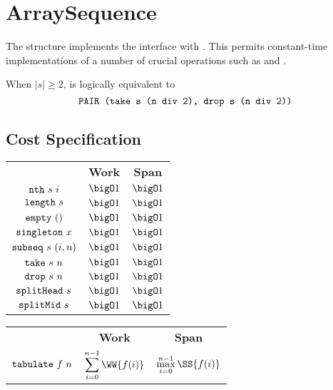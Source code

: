 \chapter{ArraySequence}
\label{ch:array-seq}
\begin{preamble}
The  structure implements the  interface
with . This permits constant-time
implementations of a number of crucial operations such as  and
.
\end{preamble}

\begin{gram}
When $|s| \geq 2$,  is logically equivalent to
\[
  \texttt{PAIR (take s (n div 2), drop s (n div 2))}
\]
\end{gram}

\section{Cost Specification}

\begin{costspec}
\begin{tabular}{c|c|c}
& \textbf{Work} & \textbf{Span} \\
$\texttt{nth}~s~i$ & $\bigO 1$ & $\bigO 1$ \\
$\texttt{length}~s$ & $\bigO 1$ & $\bigO 1$ \\
$\texttt{empty}~()$ & $\bigO 1$ & $\bigO 1$ \\
$\texttt{singleton}~x$ & $\bigO 1$ & $\bigO 1$ \\
$\texttt{subseq}~s~(i,n)$ & $\bigO 1$ & $\bigO 1$ \\
$\texttt{take}~s~n$ & $\bigO 1$ & $\bigO 1$ \\
$\texttt{drop}~s~n$ & $\bigO 1$ & $\bigO 1$ \\
$\texttt{splitHead}~s$ & $\bigO 1$ & $\bigO 1$ \\
$\texttt{splitMid}~s$ & $\bigO 1$ & $\bigO 1$
\end{tabular}
\end{costspec}

\begin{costspec}[Tabulate]
\begin{tabular}{c|c|c}
& \textbf{Work} & \textbf{Span} \\
%
$\texttt{tabulate}~f~n$ &
$\displaystyle \sum_{i = 0}^{n-1} \WW{f(i)}$ &
$\displaystyle \max_{i = 0}^{n-1} \SS{f(i)}$ \\
%
\end{tabular}
\end{costspec}

